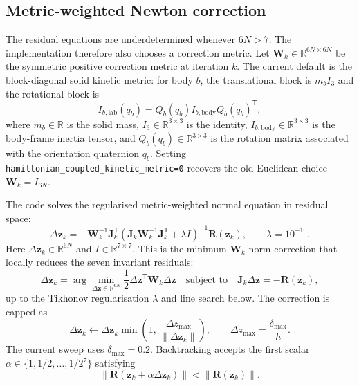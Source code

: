 \documentclass[11pt,a4paper]{article}
\newcommand{\R}{\mathbb{R}}
\newcommand{\bR}{\bm{R}}
\newcommand{\bz}{\bm{z}}
\newcommand{\bJ}{\bm{J}}
\newcommand{\bW}{\bm{W}}
\begin{document}
\subsection{Metric-weighted Newton correction}

The residual equations are underdetermined whenever $6N>7$.  The implementation
therefore also chooses a correction metric.  Let
$\bW_k\in\R^{6N\times 6N}$ be the symmetric positive correction metric at
iteration $k$.  The current default is the block-diagonal solid kinetic metric:
for body $b$, the translational block is $m_b I_3$ and the rotational block is
\begin{equation}
  I_{b,\mathrm{lab}}(q_b)
  =
  Q_b(q_b) I_{b,\mathrm{body}} Q_b(q_b)^\mathsf{T},
  \label{eq:lab-inertia-metric}
\end{equation}
where $m_b\in\R$ is the solid mass, $I_3\in\R^{3\times 3}$ is the identity,
$I_{b,\mathrm{body}}\in\R^{3\times 3}$ is the body-frame inertia tensor, and
$Q_b(q_b)\in\R^{3\times 3}$ is the rotation matrix associated with the
orientation quaternion $q_b$.  Setting
\texttt{hamiltonian\_coupled\_kinetic\_metric=0} recovers the old Euclidean
choice $\bW_k=I_{6N}$.

The code solves the regularised metric-weighted normal equation in residual
space:
\begin{equation}
  \Delta\bz_k
  =
  -\bW_k^{-1}\bJ_k^\mathsf{T}
  \left(
    \bJ_k\bW_k^{-1}\bJ_k^\mathsf{T}
    +\lambda I
  \right)^{-1}
  \bR(\bz_k),
  \qquad \lambda=10^{-10}.
  \label{eq:newton-correction}
\end{equation}
Here $\Delta\bz_k\in\R^{6N}$ and $I\in\R^{7\times 7}$.  This is the
minimum-$\bW_k$-norm correction that locally reduces the seven invariant
residuals:
\begin{equation}
  \Delta\bz_k
  =
  \arg\min_{\Delta\bz\in\R^{6N}}
  \frac{1}{2}\Delta\bz^\mathsf{T}\bW_k\Delta\bz
  \quad\text{subject to}\quad
  \bJ_k\Delta\bz=-\bR(\bz_k),
  \label{eq:metric-minimum-correction}
\end{equation}
up to the Tikhonov regularisation $\lambda$ and line search below.
The correction is capped as
\begin{equation}
  \Delta\bz_k
  \leftarrow
  \Delta\bz_k
  \min\left(
    1,\,
    \frac{\Delta z_{\max}}{\|\Delta\bz_k\|}
  \right),
  \qquad
  \Delta z_{\max}=\frac{\delta_{\max}}{h}.
  \label{eq:step-cap}
\end{equation}
The current sweep uses $\delta_{\max}=0.2$.  Backtracking accepts the first
scalar $\alpha\in\{1,1/2,\ldots,1/2^7\}$ satisfying
\begin{equation}
  \|\bR(\bz_k+\alpha\Delta\bz_k)\| < \|\bR(\bz_k)\|.
  \label{eq:line-search}
\end{equation}
\end{document}
